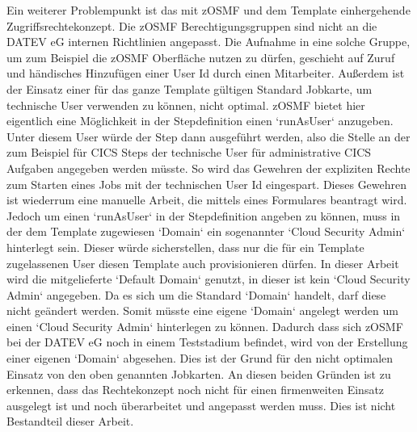 Ein weiterer Problempunkt ist das mit zOSMF und dem Template einhergehende Zugriffsrechtekonzept.
Die zOSMF Berechtigungsgruppen sind nicht an die DATEV eG internen Richtlinien angepasst.
Die Aufnahme in eine solche Gruppe, um zum Beispiel die zOSMF Oberfläche nutzen zu dürfen, geschieht auf Zuruf und händisches Hinzufügen einer User Id durch einen Mitarbeiter.
Außerdem ist der Einsatz einer für das ganze Template gültigen Standard Jobkarte, um technische User verwenden zu können, nicht optimal.
zOSMF bietet hier eigentlich eine Möglichkeit in der Stepdefinition einen `runAsUser` anzugeben.
Unter diesem User würde der Step dann ausgeführt werden, also die Stelle an der zum Beispiel für CICS Steps der technische User für administrative CICS Aufgaben angegeben werden müsste.
So wird das Gewehren der expliziten Rechte zum Starten eines Jobs mit der technischen User Id eingespart.
Dieses Gewehren ist wiederrum eine manuelle Arbeit, die mittels eines Formulares beantragt wird.
Jedoch um einen `runAsUser` in der Stepdefinition angeben zu können, muss in der dem Template zugewiesen `Domain` ein sogenannter `Cloud Security Admin` hinterlegt sein.
Dieser würde sicherstellen, dass nur die für ein Template zugelassenen User diesen Template auch provisionieren dürfen.
In dieser Arbeit wird die mitgelieferte `Default Domain` genutzt, in dieser ist kein `Cloud Security Admin` angegeben.
Da es sich um die Standard `Domain` handelt, darf diese nicht geändert werden.
Somit müsste eine eigene `Domain` angelegt werden um einen `Cloud Security Admin` hinterlegen zu können.
Dadurch dass sich zOSMF bei der DATEV eG noch in einem Teststadium befindet, wird von der Erstellung einer eigenen `Domain` abgesehen.
Dies ist der Grund für den nicht optimalen Einsatz von den oben genannten Jobkarten.
An diesen beiden Gründen ist zu erkennen, dass das Rechtekonzept noch nicht für einen firmenweiten Einsatz ausgelegt ist und noch überarbeitet und angepasst werden muss.
Dies ist nicht Bestandteil dieser Arbeit.


 